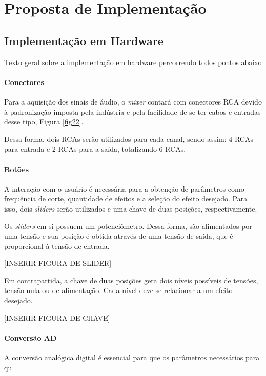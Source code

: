     \section{Proposta de Implementação}

    \subsection{Implementação em Hardware}

    Texto geral sobre a implementação em hardware percorrendo todos pontos abaixo

    \paragraph{Conectores}
    Para a aquisição dos sinais de áudio, o \textit{mixer} contará com conectores RCA devido à padronização imposta pela indústria e pela facilidade de se ter cabos e entradas desse tipo, Figura \ref{fig22}.

    Dessa forma, dois RCAs serão utilizados para cada canal, sendo assim: 4 RCAs para entrada e 2 RCAs para a saída, totalizando 6 RCAs.

    \paragraph{Botões}

    A interação com o usuário é necessária para a obtenção de parâmetros como frequência de corte, quantidade de efeitos e a seleção do efeito desejado. Para isso, dois \textit{sliders} serão utilizados e uma chave de duas posições, respectivamente. 

    Os \textit{sliders} em si possuem um potenciômetro. Dessa forma, são alimentados por uma tensão e sua posição é obtida através de uma tensão de saída, que é proporcional à tensão de entrada. 

    [INSERIR FIGURA DE SLIDER]

    Em contrapartida, a chave de duas posições gera dois níveis possíveis de tensões, tensão nula ou de alimentação. Cada nível deve se relacionar a um efeito desejado.

    [INSERIR FIGURA DE CHAVE]

    \paragraph{Conversão AD}

    A conversão analógica digital é essencial para que os parâmetros necessários para qu

